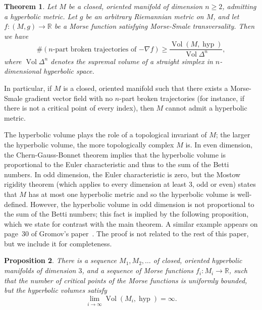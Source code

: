 \documentclass[psamsfonts]{amsart}
\newtheorem{theorem}{Theorem}
\newtheorem{proposition}[theorem]{Proposition}
\theoremstyle{remark}
\DeclareMathOperator{\Vol}{Vol}
\DeclareMathOperator{\hyp}{hyp}
\begin{document}
\begin{theorem}\label{main-thm}
Let $M$ be a closed, oriented manifold of dimension $n \geq 2$, admitting a hyperbolic metric.  Let $g$ be an arbitrary Riemannian metric on $M$, and let $f : (M, g) \rightarrow \mathbb{R}$ be a Morse function satisfying Morse-Smale transversality.  Then we have
\[\#(n\text{-part broken trajectories of }{-\nabla f}) \geq \frac{\Vol(M, \hyp)}{\Vol \Delta^n},\]
where $\Vol \Delta^n$ denotes the supremal volume of a straight simplex in $n$-dimensional hyperbolic space.
\end{theorem}

In particular, if $M$ is a closed, oriented manifold such that there exists a Morse-Smale gradient vector field with no $n$-part broken trajectories (for instance, if there is not a critical point of every index), then $M$ cannot admit a hyperbolic metric.

The hyperbolic volume plays the role of a topological invariant of $M$; the larger the hyperbolic volume, the more topologically complex $M$ is.  In even dimension, the Chern-Gauss-Bonnet theorem implies that the hyperbolic volume is proportional to the Euler characteristic and thus to the sum of the Betti numbers.  In odd dimension, the Euler characteristic is zero, but the Mostow rigidity theorem (which applies to every dimension at least 3, odd or even) states that $M$ has at most one hyperbolic metric and so the hyperbolic volume is well-defined.  However, the hyperbolic volume in odd dimension is not proportional to the sum of the Betti numbers; this fact is implied by the following proposition, which we state for contrast with the main theorem.  A similar example appears on page~30 of Gromov's paper~\cite{Gromov09}.  The proof is not related to the rest of this paper, but we include it for completeness.

\begin{proposition}
There is a sequence $M_1, M_2, \ldots$ of closed, oriented hyperbolic manifolds of dimension $3$, and a sequence of Morse functions $f_i : M_i \rightarrow \mathbb{R}$, such that the number of critical points of the Morse functions is uniformly bounded, but the hyperbolic volumes satisfy
\[\lim_{i \rightarrow \infty} \Vol(M_i, \hyp) = \infty.\]
\end{proposition}
\end{document}

